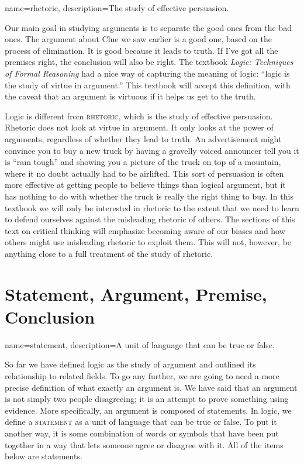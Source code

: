 {
name=rhetoric,
description={The study of effective persuasion.}
}


Our main goal in studying arguments is to separate the good ones from the bad ones. The argument about Clue we saw earlier is a good one, based on the process of elimination.  It is good because it leads to truth. If I've got all the premises right, the conclusion will also be right. The textbook \textit{Logic: Techniques of Formal Reasoning} \citep{Kalish1980} had a nice way of capturing the meaning of logic: ``logic is the study of virtue in argument.'' \label{virtue_in_argument} This textbook will accept this definition, with the caveat that an argument is virtuous if it helps us get to the truth.

Logic is different from \textsc{\gls{rhetoric}}, which is the study of effective persuasion. Rhetoric does not look at virtue in argument. It only looks at the power of arguments, regardless of whether they lead to truth. An advertisement might convince you to buy a new truck by having a gravelly voiced announcer tell you it is ``ram tough'' and showing you a picture of the truck on top of a mountain, where it no doubt actually had to be airlifted. This sort of persuasion is often more effective at getting people to believe things than logical argument, but it has nothing to do with whether the truck is really the right thing to buy. In this textbook we will only be interested in rhetoric to the extent that we need to learn to defend ourselves against the misleading rhetoric of others. The sections of this text on critical thinking will emphasize becoming aware of our biases and how others might use misleading rhetoric to exploit them. This will not, however, be anything close to a full treatment of the study of rhetoric.


\section{Statement, Argument, Premise, Conclusion}
\label{sec:SAPC}

{
name=statement,
description={A unit of language that can be true or false.}
}

So far we have defined logic as the study of argument and outlined its relationship to related fields. To go any further, we are going to need a more precise definition of what exactly an argument is. We have said that an argument is not simply two people disagreeing; it is an attempt to prove something using evidence. More specifically, an argument is composed of statements. In logic, we define a \textsc{statement} \label{def:Statement} as a unit of language that can be true or false. To put it another way, it is some combination of words or symbols that have been put together in a way that lets someone agree or disagree with it. All of the items below are statements.

